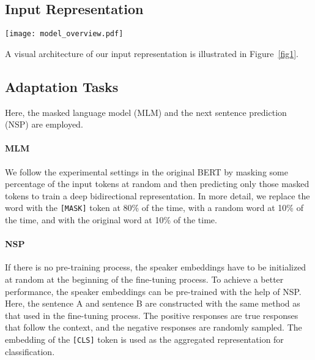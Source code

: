\documentclass[sigconf]{acmart}
\begin{document}
  \subsection{Input Representation} \label{sec2}

    \begin{figure*}
      \centering
      \texttt{[image: model\_overview.pdf]}
      \caption{The input representation of SA-BERT. The final input embeddings are the sum of the token embeddings, the segmentation embeddings, the position embeddings and the speaker embeddings.}
      \label{fig1}
    \end{figure*}

    A visual architecture of our input representation is illustrated in Figure~\ref{fig1}.

  \subsection{Adaptation Tasks}  \label{sec3}
    Here, the masked language model (MLM) and the next sentence prediction (NSP) \cite{DBLP:conf/naacl/DevlinCLT19} are employed.

    \paragraph{MLM}
    We follow the experimental settings in the original BERT by masking some percentage of the input tokens at random and then predicting only those masked tokens to train a deep bidirectional representation.
    In more detail, we replace the word with the \texttt{[MASK]} token at 80\% of the time, with a random word at 10\% of the time, and with the original word at 10\% of the time.

    \paragraph{NSP}
    If there is no pre-training process, the speaker embeddings have to be initialized at random at the beginning of the fine-tuning process.
    To achieve a better performance, the speaker embeddings can be pre-trained with the help of NSP.
    Here, the sentence A and sentence B are constructed with the same method as that used in the fine-tuning process.
    The positive responses are true responses that follow the context, and the negative responses are randomly sampled.
    The embedding of the \texttt{[CLS]} token is used as the aggregated representation for classification.
\end{document}
